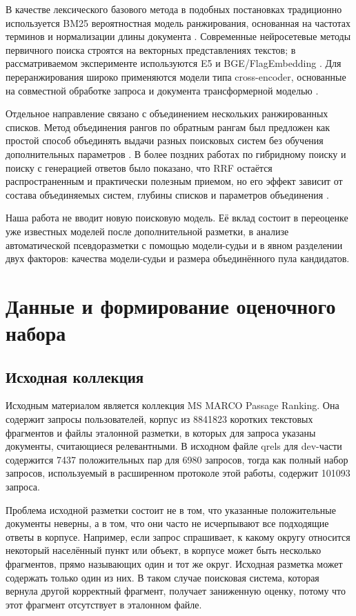 \documentclass[10pt,a4paper,twocolumn]{article}
\begin{document}
В качестве лексического базового метода в подобных постановках традиционно используется BM25 \textemdash{} вероятностная модель ранжирования, основанная на частотах терминов и нормализации длины документа \cite{robertson2009bm25}. Современные нейросетевые методы первичного поиска строятся на векторных представлениях текстов; в рассматриваемом эксперименте используются E5 \cite{wang2022e5} и BGE/FlagEmbedding \cite{xiao2023cpack}. Для переранжирования широко применяются модели типа cross-encoder, основанные на совместной обработке запроса и документа трансформерной моделью \cite{nogueira2019bert}.

Отдельное направление связано с объединением нескольких ранжированных списков. Метод объединения рангов по обратным рангам был предложен как простой способ объединять выдачи разных поисковых систем без обучения дополнительных параметров \cite{cormack2009rrf}. В более поздних работах по гибридному поиску и поиску с генерацией ответов было показано, что RRF остаётся распространенным и практически полезным приемом, но его эффект зависит от состава объединяемых систем, глубины списков и параметров объединения \cite{bruch2023fusion, mackenzie2023anserini, rackauckas2024ragfusion}.

Наша работа не вводит новую поисковую модель. Её вклад состоит в переоценке уже известных моделей после дополнительной разметки, в анализе автоматической псевдоразметки с помощью модели-судьи и в явном разделении двух факторов: качества модели-судьи и размера объединённого пула кандидатов.

\section{Данные и формирование оценочного набора}

\subsection{Исходная коллекция}

Исходным материалом является коллекция MS MARCO Passage Ranking. Она содержит запросы пользователей, корпус из 8841823 коротких текстовых фрагментов и файлы эталонной разметки, в которых для запроса указаны документы, считающиеся релевантными. В исходном файле qrels для dev-части содержится 7437 положительных пар для 6980 запросов, тогда как полный набор запросов, используемый в расширенном протоколе этой работы, содержит 101093 запроса.

Проблема исходной разметки состоит не в том, что указанные положительные документы неверны, а в том, что они часто не исчерпывают все подходящие ответы в корпусе. Например, если запрос спрашивает, к какому округу относится некоторый населённый пункт или объект, в корпусе может быть несколько фрагментов, прямо называющих один и тот же округ. Исходная разметка может содержать только один из них. В таком случае поисковая система, которая вернула другой корректный фрагмент, получает заниженную оценку, потому что этот фрагмент отсутствует в эталонном файле.
\end{document}
